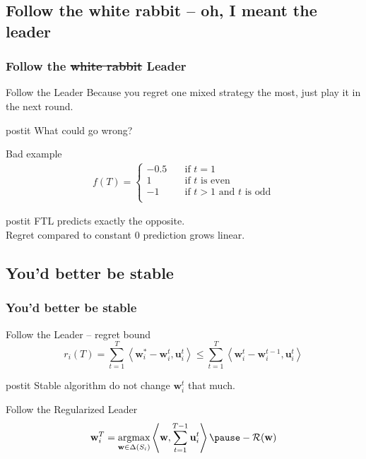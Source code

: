 \documentclass{beamer}
\renewcommand{\vec}[1]{\ensuremath{{\bf #1}}}
\newcommand{\dotp}[2]{\ensuremath{\left\langle #1, #2 \right\rangle}}
\newcommand{\mst}{\ensuremath{w}}
\newcommand{\mR}{\ensuremath{\mathcal{R}}}
\DeclareMathOperator*{\argmax}{argmax}
\begin{document}
\subsection{Follow the white rabbit -- oh, I meant the leader}
\begin{frame}
	\frametitle{Follow the \st{white rabbit} Leader}
	\begin{block}{Follow the Leader}
		Because you regret one mixed strategy the most, just play it in the next round.
	\end{block}
	\pause
	\begin{beamercolorbox}[sep=1em]{postit}
		What could go wrong?
	\end{beamercolorbox}
	\pause
	\begin{block}{Bad example}
		\begin{align*}
			 f(T) =
			\begin{cases}
			-0.5       & \quad \text{if } t = 1 \\
			1  & \quad \text{if } t \text{ is even}\\
			-1  & \quad \text{if } t > 1 \text{ and } t \text{ is odd}\\
			\end{cases}
		\end{align*}
		\begin{beamercolorbox}[sep=1em]{postit}
			FTL predicts exactly the opposite.\\
			Regret compared to constant 0 prediction grows linear.
		\end{beamercolorbox}
	\end{block}
\end{frame}


\subsection{You'd better be stable}
\begin{frame}
	\frametitle{You'd better be stable}
	\begin{block}{Follow the Leader -- regret bound}
		\begin{equation*}
			r_i(T) =  \sum_{t=1}^{T} \left< \mathbf{w}^*_i - \mathbf{w}^t_i, \mathbf{u}^t_i \right> \leq
			\sum_{t=1}^{T} \left< \mathbf{w}^t_i - \mathbf{w}^{t-1}_i, \mathbf{u}^t_i \right>
		\end{equation*}
	\end{block}
	\pause
	\begin{beamercolorbox}[sep=1em]{postit}
		Stable algorithm do not change $\mathbf{w}^t_i$ that much.
	\end{beamercolorbox}
	\pause
	\begin{block}{Follow the Regularized Leader }
	\begin{equation*}
	\vec{\mst}_i^T
	= \argmax_{\vec{\mst} \in \Delta(S_i)} \dotp{\vec{\mst}}{\sum_{t=1}^{T-1} \vec{u}_i^t} \pause-\mR(\vec{\mst})
	\end{equation*}
	\end{block}
\end{frame}
\end{document}
